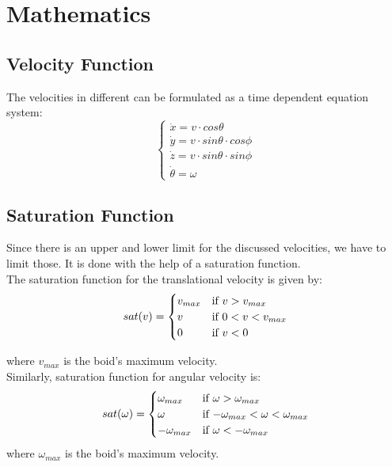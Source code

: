 \documentclass[12pt]{article}
\begin{document}
\section{Mathematics}

\subsection{Velocity Function}
The velocities in different can be formulated as a time dependent equation system:\\
\begin{equation}
    \begin{cases}
    \Dot{x} = v \cdot cos\theta \\
    \Dot{y} = v \cdot sin\theta \cdot cos \phi\\
    \Dot{z} = v \cdot sin\theta \cdot sin \phi\\
    \Dot{\theta} = \omega
    \end{cases}
\end{equation}

\subsection{Saturation Function}
Since there is an upper and lower limit for the discussed velocities, we have to limit those. It is done with the help of a saturation function.\\
The saturation function for the translational velocity is given by:\\
\begin{equation}
    sat(v)=\begin{cases}
    v_{max}  & $\text{if $v>v_{max}$}$\\
    v  & $\text{if $0<v<v_{max}$}$\\
    0  & $\text{if $v<0$}$
    \end{cases}
\end{equation}

where $v_{max}$ is the boid's maximum velocity.\\

Similarly, saturation function for angular velocity is:\\
\begin{equation}
    sat(\omega)=\begin{cases}
    \omega _{max}  & $\text{if $\omega>\omega _{max}$}$\\
    \omega  & $\text{if $-\omega _{max}<\omega<\omega _{max}$}$\\
    -\omega _{max}  & $\text{if $\omega<-\omega _{max}$}$
    \end{cases}
\end{equation}
where $\omega _{max}$ is the boid's maximum velocity.\\
\end{document}
